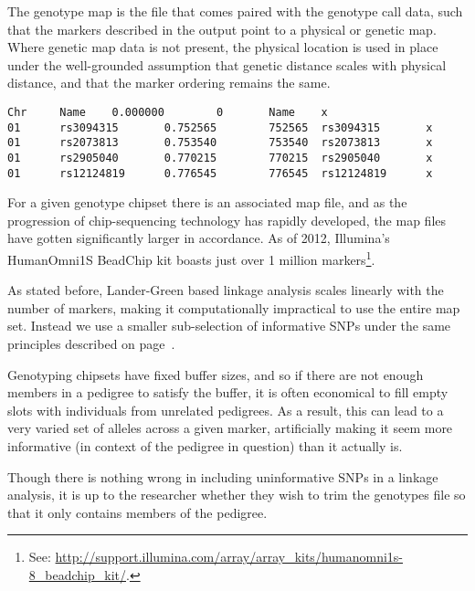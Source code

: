 The genotype map is the file that comes paired with the genotype call data, such that the markers described in the output point to a physical or genetic map. Where genetic map data is not present, the physical location is used in place under the well-grounded assumption that genetic distance scales with physical distance, and that the marker ordering remains the same.

\begingroup
\vspace{10pt}
\begin{lstlisting}
Chr     Name    0.000000        0       Name    x
01      rs3094315       0.752565        752565  rs3094315       x
01      rs2073813       0.753540        753540  rs2073813       x
01      rs2905040       0.770215        770215  rs2905040       x
01      rs12124819      0.776545        776545  rs12124819      x
\end{lstlisting}
\vspace{-10pt}
\endgroup

For a given genotype chipset there is an associated map file, and as the progression of chip-sequencing technology has rapidly developed, the map files have gotten significantly larger in accordance. As of 2012, Illumina's HumanOmni1S BeadChip kit boasts just over 1 million markers\footnote{See: \url{http://support.illumina.com/array/array_kits/humanomni1s-8_beadchip_kit/}.}.

As stated before, Lander-Green based linkage analysis scales linearly with the number of markers, making it computationally impractical to use the entire map set. Instead we use a smaller sub-selection of informative SNPs under the same principles described on page~\pageref{informativemarkers}.

Genotyping chipsets have fixed buffer sizes, and so if there are not enough members in a pedigree to satisfy the buffer, it is often economical to fill empty slots with individuals from unrelated pedigrees. As a result, this can lead to a very varied set of alleles across a given marker, artificially making it seem more informative (in context of the pedigree in question) than it actually is. 

Though there is nothing wrong in including uninformative SNPs in a linkage analysis, it is up to the researcher whether they wish to trim the genotypes file so that it only contains members of the pedigree.

